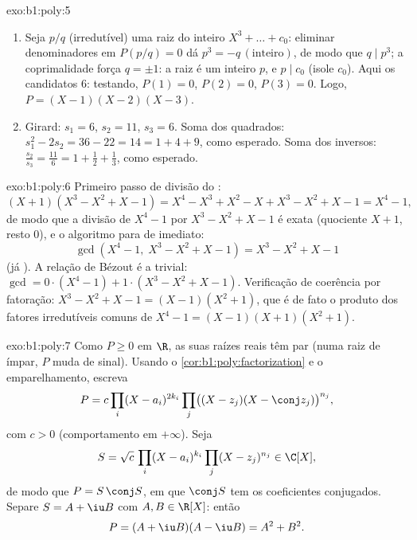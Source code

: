 \begin{solution}{exo:b1:poly:5}
\begin{enumerate}
  \item Seja $p/q$ (irredutível) uma raiz do  inteiro 
        $X^3 + \dots + c_0$: eliminar denominadores em
        $P(p/q) = 0$ dá $p^3 = -q\,(\text{inteiro})$, de modo que $q \mid
        p^3$; a coprimalidade força $q = \pm 1$: a raiz é um inteiro
        $p$, e $p \mid c_0$ (isole $c_0$). Aqui os candidatos
         $6$: testando, $P(1) = 0$, $P(2) = 0$, $P(3) = 0$. Logo,
        $P = (X-1)(X-2)(X-3)$.
  \item Girard: $s_1 = 6$, $s_2 = 11$, $s_3 = 6$. Soma dos quadrados:
        $s_1^2 - 2s_2 = 36 - 22 = 14 = 1 + 4 + 9$, como esperado. Soma dos inversos:
        $\frac{s_2}{s_3} = \frac{11}{6} = 1 + \frac12 + \frac13$, como esperado.
\end{enumerate}
\end{solution}

\begin{solution}{exo:b1:poly:6}
Primeiro passo de divisão do :
\[
(X + 1)(X^3 - X^2 + X - 1)
= X^4 - X^3 + X^2 - X + X^3 - X^2 + X - 1 = X^4 - 1 ,
\]
de modo que a divisão de $X^4 - 1$ por $X^3 - X^2 + X - 1$ é exata
(quociente $X + 1$, resto $0$), e o algoritmo para de imediato:
\[
\gcd(X^4 - 1,\; X^3 - X^2 + X - 1) = X^3 - X^2 + X - 1
\]
(já ). A relação de Bézout é a trivial: $\gcd = 0
\cdot (X^4 - 1) + 1 \cdot (X^3 - X^2 + X - 1)$. Verificação de coerência por
fatoração: $X^3 - X^2 + X - 1 = (X - 1)(X^2 + 1)$, que é de fato
o produto dos fatores irredutíveis comuns de $X^4 - 1 =
(X-1)(X+1)(X^2+1)$.
\end{solution}

\begin{solution}{exo:b1:poly:7}
Como $P \geq 0$ em $\R$, as suas raízes reais têm  par (numa
raiz de  ímpar, $P$ muda de sinal). Usando o
\cref{cor:b1:poly:factorization} e o emparelhamento, escreva
\[
P = c \prod_i (X - a_i)^{2k_i} \prod_j \bigl((X - z_j)(X - \conj
z_j)\bigr)^{n_j},
\]
com $c > 0$ (comportamento em $+\infty$). Seja
\[
S = \sqrt c\, \prod_i (X - a_i)^{k_i} \prod_j (X - z_j)^{n_j}
\in \C[X],
\]
de modo que $P = S\,\conj S$, em que $\conj S$ tem os
coeficientes conjugados. Separe $S = A + \iu B$ com $A, B \in \R[X]$: então
\[
P = (A + \iu B)(A - \iu B) = A^2 + B^2 .
\]
\end{solution}


